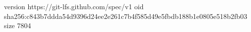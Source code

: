 version https://git-lfs.github.com/spec/v1
oid sha256:c843b7ddda54d9396d24ee2e261c7b4f585d49e5fbdb188b1e0805e518b2fb03
size 7804
